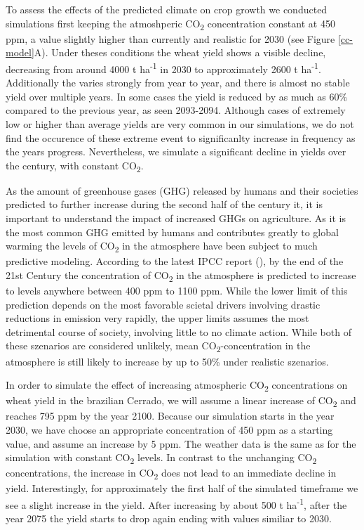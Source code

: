 \documentclass[a4paper,12pt,oneside]{article}
\begin{document}
To assess the effects of the predicted climate on crop growth we conducted simulations first keeping the atmoshperic CO\textsubscript{2} concentration constant at 450 ppm, a value slightly higher than currently and realistic for 2030 (see Figure \ref{cc-model}A). Under theses conditions the wheat yield shows a visible decline, decreasing from around 4000 t ha\textsuperscript{-1} in 2030 to approximately 2600 t ha\textsuperscript{-1}. Additionally the varies strongly from year to year, and there is almost no stable yield over multiple years. In some cases the yield is reduced by as much as 60\% compared to the previous year, as seen 2093-2094. Although cases of extremely low or higher than average yields are very common in our simulations, we do not find the occurence of these extreme event to significanlty increase in frequency as the years progress. Nevertheless, we simulate a significant decline in yields over the century, with constant CO\textsubscript{2}.

As the amount of greenhouse gases (GHG) released by humans and their societies predicted to further increase during the second half of the century it, it is important to understand the impact of increased GHGs on agriculture. As it is the most common GHG emitted by humans and contributes greatly to global warming the levels of CO\textsubscript{2} in the atmosphere have been subject to much predictive modeling. According to the latest IPCC report (\cite{poertner-2022-climat-chang}), by the end of the 21st Century the concentration of CO\textsubscript{2} in the atmosphere is predicted to increase to levels anywhere between 400 ppm to 1100 ppm. While the lower limit of this prediction depends on the most favorable scietal drivers involving drastic reductions in emission very rapidly, the upper limits assumes the most detrimental course of society, involving little to no climate action. While both of these szenarios are considered unlikely, mean CO\textsubscript{2}-concentration in the atmosphere is still likely to increase by up to 50\% under realistic szenarios.

In order to simulate the effect of increasing atmospheric CO\textsubscript{2} concentrations on wheat yield in the brazilian Cerrado, we will assume a linear increase of CO\textsubscript{2} and reaches 795 ppm by the year 2100. Because our simulation starts in the year 2030, we have choose an appropriate concentration of 450 ppm as a starting value, and assume an increase by 5 ppm. The weather data is the same as for the simulation with constant CO\textsubscript{2} levels.
In contrast to the unchanging CO\textsubscript{2} concentrations, the increase in CO\textsubscript{2} does not lead to an immediate decline in yield. Interestingly, for approximately the first half of the simulated timeframe we see a slight increase in the yield. After increasing by about 500 t ha\textsuperscript{-1}, after the year 2075 the yield starts to drop again ending with values similiar to 2030.
\end{document}
